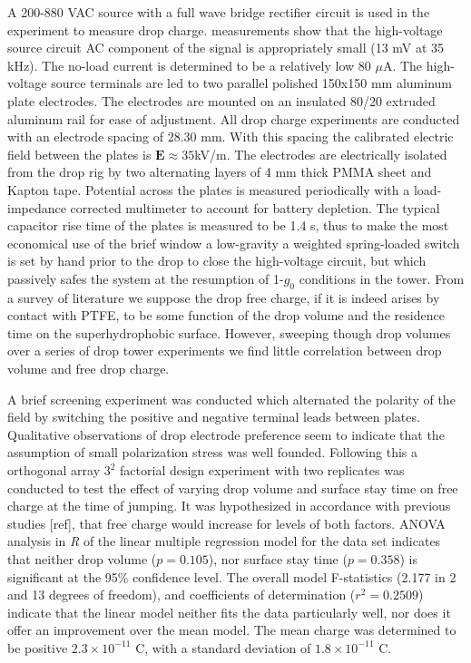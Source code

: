 \documentclass[12pt,a4paper,oneside]{book}
\begin{document}
A 200-880 VAC source with a full wave bridge rectifier circuit is used in the experiment to measure drop charge.  measurements show that the high-voltage source circuit AC component of the signal is appropriately small (13 mV at 35 kHz). The no-load current is determined to be a relatively low 80 $\mu$A. The high-voltage source terminals are led to two parallel polished 150x150 mm aluminum plate electrodes. The electrodes are mounted on an insulated 80/20 extruded aluminum rail for ease of adjustment. All drop charge experiments are conducted with an electrode spacing of 28.30 mm. With this spacing the calibrated electric field between the plates is $\mathbf{E} \approx 35$kV/m. The electrodes are electrically isolated from the drop rig by two alternating layers of 4 mm thick PMMA sheet and Kapton tape. Potential across the plates is measured periodically with a load-impedance corrected multimeter to account for battery depletion. The typical capacitor rise time of the plates is measured to be 1.4 s, thus to make the most economical use of the brief window a low-gravity a weighted spring-loaded switch is set by hand prior to the drop to close the high-voltage circuit, but which passively safes the system at the resumption of 1-$g_0$ conditions in the tower. From a survey of literature we suppose the drop free charge, if it is indeed arises by contact with PTFE, to be some function of the drop volume and the residence time on the superhydrophobic surface. However, sweeping though drop volumes over a series of drop tower experiments we find little correlation between drop volume  and free drop charge.

A brief screening experiment was conducted which alternated the polarity of the field by switching the positive and negative terminal leads between plates. Qualitative observations of drop electrode preference seem to indicate that the assumption of small polarization stress was well founded. Following this a orthogonal array $3^2$ factorial design experiment with two replicates was conducted to test the effect of varying drop volume and surface stay time on free charge at the time of jumping. It was hypothesized in accordance with previous studies [ref], that free charge would increase for levels of both factors. ANOVA analysis in \emph{R} of the linear multiple regression model for the data set indicates that neither drop volume ($p=0.105$), nor surface stay time ($p=0.358$) is significant at the 95\% confidence level. The overall model F-statistics (2.177 in 2 and 13 degrees of freedom), and coefficients of determination ($r^2 = 0.2509$) indicate that the linear model neither fits the data particularly well, nor does it offer an improvement over the mean model. The mean charge was determined to be positive $2.3 \times 10^{-11}$ C, with a standard deviation of $1.8 \times 10^{-11}$ C.

\singlespacing
\backmatter
\printbibliography
\end{document}

